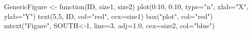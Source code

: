 \begin{Schunk}
\begin{Sinput}
 GenericFigure <- function(ID, size1, size2){
   plot(0:10, 0:10, type="n", xlab="X", ylab="Y")
   text(5,5, ID, col="red", cex=size1)
   box("plot", col="red")
   mtext("Figure",
         SOUTH<-1, line=3, adj=1.0, cex=size2,   col="blue")
 }
\end{Sinput}
\end{Schunk}

